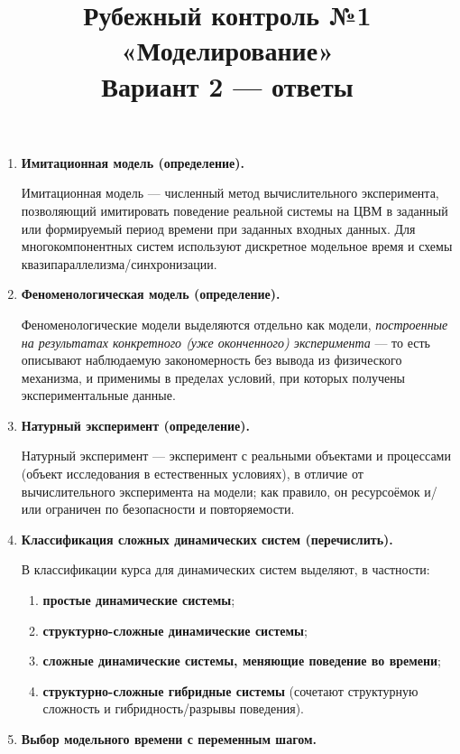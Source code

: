 \documentclass[12pt,a4paper]{article}
\title{Рубежный контроль №1 «Моделирование»\\Вариант 2 — ответы}
\author{}
\date{}
\begin{document}
\maketitle

\begin{enumerate}[label=\textbf{\arabic*.}]

\item \textbf{Имитационная модель (определение).}

Имитационная модель — численный метод вычислительного эксперимента, позволяющий имитировать поведение реальной системы на ЦВМ в заданный или формируемый период времени при заданных входных данных. Для многокомпонентных систем используют дискретное модельное время и схемы квазипараллелизма/синхронизации.

\item \textbf{Феноменологическая модель (определение).}

Феноменологические модели выделяются отдельно как модели, \emph{построенные на результатах конкретного (уже оконченного) эксперимента} — то есть описывают наблюдаемую закономерность без вывода из физического механизма, и применимы в пределах условий, при которых получены экспериментальные данные.

\item \textbf{Натурный эксперимент (определение).}

Натурный эксперимент — эксперимент с реальными объектами и процессами (объект исследования в естественных условиях), в отличие от вычислительного эксперимента на модели; как правило, он ресурсоёмок и/или ограничен по безопасности и повторяемости.

\item \textbf{Классификация сложных динамических систем (перечислить).}

В классификации курса для динамических систем выделяют, в частности:
\begin{enumerate}[label=\arabic*)]
\item \textbf{простые динамические системы};
\item \textbf{структурно-сложные динамические системы};
\item \textbf{сложные динамические системы, меняющие поведение во времени};
\item \textbf{структурно-сложные гибридные системы} (сочетают структурную сложность и гибридность/разрывы поведения).
\end{enumerate}

\item \textbf{Выбор модельного времени с переменным шагом.}


\end{enumerate}
\end{document}

